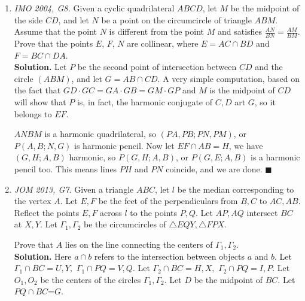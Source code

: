 \documentclass[11pt,a4paper]{article}
\begin{document}
\begin{enumerate}
\item \emph {IMO 2004, G8.} Given a cyclic quadrilateral $ABCD$, let $M$ be the midpoint of the side $CD$, and let $N$ be a point on the circumcircle of triangle $ABM$. Assume that the point $N$ is different from the point $M$ and satisfies $\frac{AN}{BN}=\frac{AM}{BM}$. Prove that the points $E$, $F$, $N$ are collinear, where $E=AC\cap BD$ and $F=BC\cap DA$.\\
\textbf {Solution.} Let $P$ be the second point of intersection between $CD$ and the circle $(ABM)$, and let $G=AB\cap CD$. A very simple computation, based on the fact that $GD\cdot GC=GA\cdot GB=GM\cdot GP$ and $M$ is the midpoint of $CD$ will show that $P$ is, in fact, the harmonic conjugate of $C,D$ art $G$, so it belongs to $EF$.

$ANBM$ is a harmonic quadrilateral, so $(PA,PB;PN,PM)$, or $P(A,B;N,G)$ is harmonic pencil. Now let $EF\cap AB=H$, we have $(G,H;A,B)$ harmonic, so $P(G,H;A,B)$, or $P(G,E;A,B)$ is a harmonic pencil too. This means lines $PH$ and $PN$ coincide, and we are done. $\blacksquare$
\item\emph {JOM 2013, G7.} Given a triangle $ABC$, let $l$ be the median corresponding to the vertex $A$.  Let $E,F$ be the feet of the perpendiculars from $B,C$ to $AC,AB$.  Reflect the points $E,F$ across $l$ to the points $P,Q$.  Let $AP, AQ$ intersect $BC$ at $X,Y$.  Let $\Gamma_1, \Gamma_ 2$ be the circumcircles of $\triangle EQY,\triangle FPX.$

Prove that $A$ lies on the line connecting the centers of $\Gamma_1, \Gamma_2$.\\
\textbf {Solution.} Here $a\cap b$ refers  to  the  intersection  between  objects $a$ and $b$. Let $\Gamma_1\cap BC=U,Y,$ $\Gamma_1\cap PQ=V,Q$. Let $\Gamma_2\cap BC=H,X,$ $\Gamma_2\cap PQ=I,P$. Let $O_1, O_2$ be the centers of the circles $\Gamma_1, \Gamma_2$. Let $D$ be the midpoint of $BC$. Let $PQ\cap BC$=$G$.


\end{enumerate}
\end{document}
